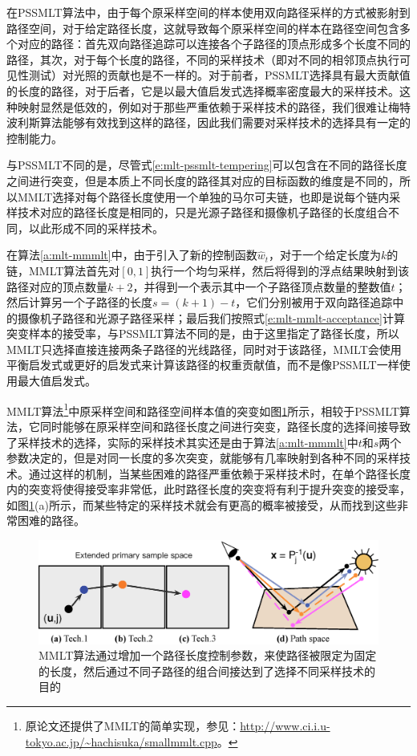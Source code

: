 在PSSMLT算法中，由于每个原采样空间的样本使用双向路径采样的方式被影射到路径空间，对于给定路径长度，这就导致每个原采样空间的样本在路径空间包含多个对应的路径：首先双向路径追踪可以连接各个子路径的顶点形成多个长度不同的路径，其次，对于每个长度的路径，不同的采样技术（即对不同的相邻顶点执行可见性测试）对光照的贡献也是不一样的。对于前者，PSSMLT选择具有最大贡献值的长度的路径，对于后者，它是以最大值启发式选择概率密度最大的采样技术。这种映射显然是低效的，例如对于那些严重依赖于采样技术的路径，我们很难让梅特波利斯算法能够有效找到这样的路径，因此我们需要对采样技术的选择具有一定的控制能力。

与PSSMLT不同的是，尽管式\ref{e:mlt-pssmlt-tempering}可以包含在不同的路径长度之间进行突变，但是本质上不同长度的路径其对应的目标函数的维度是不同的，所以MMLT选择对每个路径长度使用一个单独的马尔可夫链，也即是说每个链内采样技术对应的路径长度是相同的，只是光源子路径和摄像机子路径的长度组合不同，以此形成不同的采样技术。

在算法\ref{a:mlt-mmmlt}中，由于引入了新的控制函数$\hat{w}_t$，对于一个给定长度为$k$的链，MMLT算法首先对$[0,1]$执行一个均匀采样，然后将得到的浮点结果映射到该路径对应的顶点数量$k+2$，并得到一个表示其中一个子路径顶点数量的整数值$t$；然后计算另一个子路径的长度$s=(k+1)-t$，它们分别被用于双向路径追踪中的摄像机子路径和光源子路径采样；最后我们按照式\ref{e:mlt-mmlt-acceptance}计算突变样本的接受率，与PSSMLT算法不同的是，由于这里指定了路径长度，所以MMLT只选择直接连接两条子路径的光线路径，同时对于该路径，MMLT会使用平衡启发式或更好的启发式来计算该路径的权重贡献值，而不是像PSSMLT一样使用最大值启发式。

MMLT算法\footnote{原论文还提供了MMLT的简单实现，参见：\url{http://www.ci.i.u-tokyo.ac.jp/~hachisuka/smallmmlt.cpp}。}中原采样空间和路径空间样本值的突变如图\ref{f:mlt-mmlt}所示，相较于PSSMLT算法，它同时能够在原采样空间和路径长度之间进行突变，路径长度的选择间接导致了采样技术的选择，实际的采样技术其实还是由于算法\ref{a:mlt-mmmlt}中$t$和$s$两个参数决定的，但是对同一长度的多次突变，就能够有几率映射到各种不同的采样技术。通过这样的机制，当某些困难的路径严重依赖于采样技术时，在单个路径长度内的突变将使得接受率非常低，此时路径长度的突变将有利于提升突变的接受率，如图\ref{f:mlt-mmlt}(a)所示，而某些特定的采样技术就会有更高的概率被接受，从而找到这些非常困难的路径。

\begin{figure}
	\includegraphics[width=1.0\textwidth]{figures/mlt/mmlt}
	\caption{MMLT算法通过增加一个路径长度控制参数，来使路径被限定为固定的长度，然后通过不同子路径的组合间接达到了选择不同采样技术的目的}
	\label{f:mlt-mmlt}
\end{figure}




